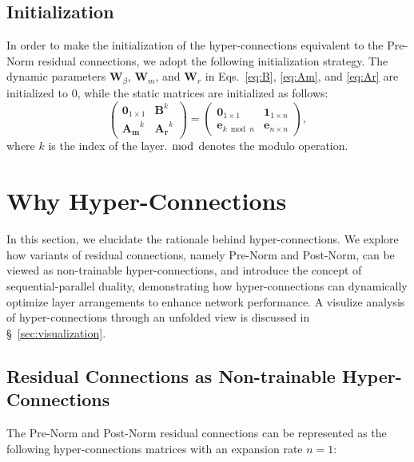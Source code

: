 \documentclass{article} %
\begin{document}
\subsection{Initialization}
In order to make the initialization of the hyper-connections equivalent to the Pre-Norm residual connections, we adopt the following initialization strategy. The dynamic parameters $\mathbf{W}_{\beta}$, $\mathbf{W}_{m}$, and $\mathbf{W}_{r}$ in Eqs.~\ref{eq:B}, \ref{eq:Am}, and \ref{eq:Ar} are initialized to 0, while the static matrices are initialized as follows:
\begin{equation}
\label{eq:initialization}
\begin{pmatrix}
\mathbf{0}_{1\times1} & \mathbf{B}^k \\
\mathbf{A_m}^k & \mathbf{A_r}^k
\end{pmatrix}
=\begin{pmatrix}
\mathbf{0}_{1 \times 1} & \mathbf{1}_{1 \times n}\\
\mathbf{e}_{k \bmod n} & \mathbf{e}_{n\times n}
\end{pmatrix},
\end{equation}
where $k$ is the index of the layer. $\bmod$ denotes the modulo operation. 



\section{Why Hyper-Connections}
\label{anlyze}
In this section, we elucidate the rationale behind hyper-connections. We explore how variants of residual connections, namely Pre-Norm and Post-Norm, can be viewed as non-trainable hyper-connections, and introduce the concept of sequential-parallel duality, demonstrating how hyper-connections can dynamically optimize layer arrangements to enhance network performance. A visulize analysis of hyper-connections through an unfolded view is discussed in \S~\ref{sec:visualization}.

\subsection{Residual Connections as Non-trainable Hyper-Connections}
\label{sec:residual}
The Pre-Norm and Post-Norm residual connections can be represented as the following hyper-connections matrices with an expansion rate $n=1$:
\end{document}
